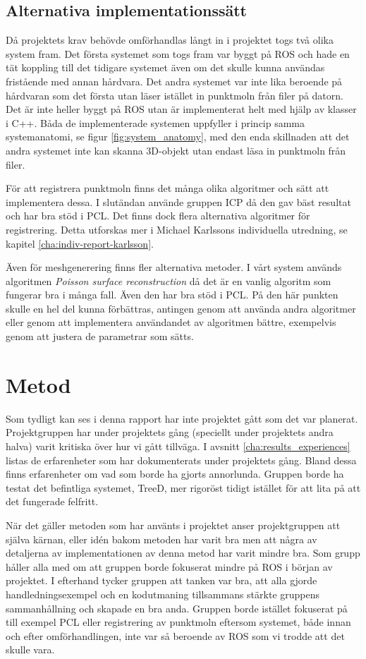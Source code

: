 \subsection{Alternativa implementationssätt}
Då projektets krav behövde omförhandlas långt in i projektet togs två olika system fram. Det första systemet som togs fram var byggt på ROS och hade en tät koppling till det tidigare systemet även om det skulle kunna användas fristående med annan hårdvara. Det andra systemet var inte lika beroende på hårdvaran som det första utan läser istället in punktmoln från filer på datorn. Det är inte heller byggt på ROS utan är implementerat helt med hjälp av klasser i C++. Båda de implementerade systemen uppfyller i princip samma systemanatomi, se figur \ref{fig:system_anatomy}, med den enda skillnaden att det andra systemet inte kan skanna 3D-objekt utan endast läsa in punktmoln från filer.

För att registrera punktmoln finns det många olika algoritmer och sätt att implementera dessa. I slutändan använde gruppen ICP då den gav bäst resultat och har bra stöd i PCL. Det finns dock flera alternativa algoritmer för registrering. Detta utforskas mer i Michael Karlssons individuella utredning, se kapitel \ref{cha:indiv-report-karlsson}.

Även för meshgenerering finns fler alternativa metoder. I vårt system används algoritmen \textit{Poisson surface reconstruction} då det är en vanlig algoritm som fungerar bra i många fall. Även den har bra stöd i PCL. På den här punkten skulle en hel del kunna förbättras, antingen genom att använda andra algoritmer eller genom att implementera användandet av algoritmen bättre, exempelvis genom att justera de parametrar som sätts.


\section{Metod}
\label{sec:discussion-method}
Som tydligt kan ses i denna rapport har inte projektet gått som det var planerat. Projektgruppen har under projektets gång (speciellt under projektets andra halva) varit kritiska över hur vi gått tillväga. I avsnitt \ref{cha:results_experiences} listas de erfarenheter som har dokumenterats under projektets gång. Bland dessa finns erfarenheter om vad som borde ha gjorts annorlunda. Gruppen borde ha testat det befintliga systemet, TreeD, mer rigoröst tidigt istället för att lita på att det fungerade felfritt.

När det gäller metoden som har använts i projektet anser projektgruppen att själva kärnan, eller idén bakom metoden har varit bra men att några av detaljerna av implementationen av denna metod har varit mindre bra. Som grupp håller alla med om att gruppen borde fokuserat mindre på ROS i början av projektet. I efterhand tycker gruppen att tanken var bra, att alla gjorde handledningsexempel och en kodutmaning tillsammans stärkte gruppens sammanhållning och skapade en bra anda. Gruppen borde istället fokuserat på till exempel PCL eller registrering av punktmoln eftersom systemet, både innan och efter omförhandlingen, inte var så beroende av ROS som vi trodde att det skulle vara.

